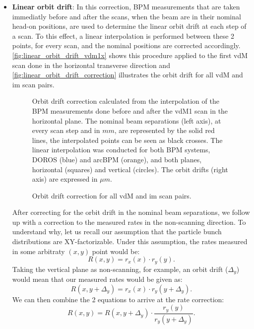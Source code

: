 \begin{itemize}
	\item \textbf{Linear orbit drift}: In this correction, BPM measurements that are taken immediatly before and after the scans, when the beam are in their nominal head-on positions, are used to determine the linear orbit drift at each step of a scan. To this effect, a linear interpolation is performed between these 2 points, for every scan, and the nominal positions are corrected accordingly. \autoref{fig:linear_orbit_drift_vdm1x} shows this procedure applied to the first vdM scan done in the horizontal transverse direction and \autoref{fig:linear_orbit_drift_correction} illustrates the orbit drift for all vdM and im scan pairs.

	\begin{figure}[!htb]
		\centering
		\caption{Orbit drift correction calculated from the interpolation of the BPM measurements done before and after the vdM1 scan in the horizontal plane. The nominal beam separations (left axis), at every scan step and in $mm$,  are represented by the solid red lines, the interpolated points can be seen as black crosses. The linear interpolation was conducted for both BPM systems, DOROS (blue) and arcBPM (orange), and both planes, horizontal (squares) and vertical (circles). The orbit drifts (right axis) are expressed in $\mu m$.}
		\label{fig:linear_orbit_drift_vdm1x}
	\end{figure}

	\begin{figure}[!htb]
		\centering
		\caption{Orbit drift correction for all vdM and im scan pairs.}
		\label{fig:linear_orbit_drift_correction}
	\end{figure}

	After correcting for the orbit drift in the nominal beam separations, we follow up with a correction to the measured rates in the non-scanning direction. To understand why, let us recall our assumption that the particle bunch distributions are XY-factorizable. Under this assumption, the rates measured in some arbitraty $(x, y)$ point would be:
	\begin{equation}
		R\left( x, y \right) = r_x(x) \cdot r_y(y).
	\end{equation}
	Taking the vertical plane as non-scanning, for example, an orbit drift ($\Delta_y$) would mean that our measured rates would be given as:
	\begin{equation}
		R\left( x, y + \Delta_y \right) = r_x(x) \cdot r_y(y + \Delta_y).
	\end{equation}
	We can then combine the 2 equations to arrive at the rate correction:
	\begin{equation}
		R\left( x, y\right) = R\left( x, y + \Delta_y \right) \cdot \frac{r_y(y)}{r_y(y + \Delta_y)}.
	\end{equation}


\end{itemize}
